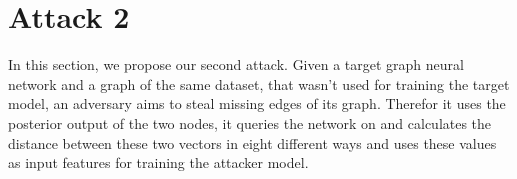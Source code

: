   \section{Attack 2}

    In this section, we propose our second attack. Given a target graph neural network and a graph of the same dataset, that wasn't used for training the target model, an adversary aims to steal missing edges of its graph.
    Therefor it uses the posterior output of the two nodes, it queries the network on and calculates the distance between these two vectors in eight different ways and uses these values as input features for training the attacker model.




